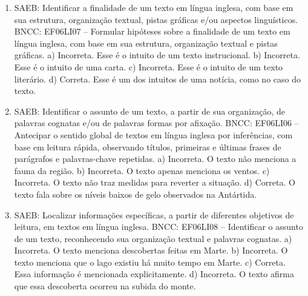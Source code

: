 
\begin{enumerate}
\item
SAEB: Identificar a finalidade de um texto em língua inglesa, com base
em sua estrutura, organização textual, pistas gráficas e/ou aspectos
linguísticos.
BNCC: EF06LI07 -- Formular hipóteses sobre a finalidade de um texto em
língua inglesa, com base em sua estrutura, organização textual e pistas
gráficas.
a) Incorreta. Esse é o intuito de um texto instrucional.
b) Incorreta. Esse é o intuito de uma carta.
c) Incorreta. Esse é o intuito de um texto literário.
d) Correta. Esse é um dos intuitos de uma notícia, como no caso do
texto.

\item
SAEB: Identificar o assunto de um texto, a partir de sua organização, de
palavras cognatas e/ou de palavras formas por afixação.
BNCC: EF06LI06 -- Antecipar o sentido global de textos em língua inglesa
por inferências, com base em leitura rápida, observando títulos,
primeiras e últimas frases de parágrafos e palavras-chave repetidas.
a) Incorreta. O texto não menciona a fauna da região.
b) Incorreta. O texto apenas menciona os ventos.
c) Incorreta. O texto não traz medidas para reverter a situação.
d) Correta. O texto fala sobre os níveis baixos de gelo observados na
Antártida.

\item
SAEB: Localizar informações específicas, a partir de diferentes
objetivos de leitura, em textos em língua inglesa.
BNCC: EF06LI08 -- Identificar o assunto de um texto, reconhecendo sua
organização textual e palavras cognatas.
a) Incorreta. O texto menciona descobertas feitas em Marte.
b) Incorreta. O texto menciona que o lago existiu há muito tempo em
Marte.
c) Correta. Essa informação é mencionada explicitamente.
d) Incorreta. O texto afirma que essa descoberta ocorreu na subida do
monte.
\end{enumerate}


